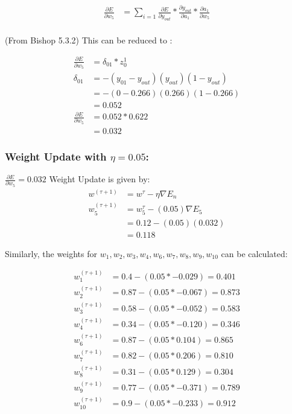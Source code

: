 \documentclass[a4paper]{article}
\begin{document}
\begin{align*}
    \frac{\partial E}{\partial w_{5}} &= \sum_{i=1} \frac{\partial E}{\partial y_{out}}* 
                                                \frac{\partial y_{out}}{\partial a_{1}}*
                                                \frac{\partial a_{1}}{\partial w_{5}}\\
\end{align*}{}

(From Bishop 5.3.2) This can be reduced to :

\begin{align*}
    \frac{\partial E}{\partial w_{5}} &= \delta_{01}*z_{0}^{1} \\
    \delta_{01} &= - (y_{01} - y_{out})(y_{out})(1 - y_{out})\\
                &= - (0 - 0.266)(0.266)(1-0.266) \\
                &= 0.052 \\
    \frac{\partial E}{\partial w_{5}} &= 0.052 * 0.622 \\
    &= 0.032
\end{align*}{}

\subsubsection*{Weight Update with $\eta = 0.05$:}

$\frac{\partial E}{\partial w_{5}} = 0.032$ 
Weight Update is given by:
\begin{align*}
    w^{(\tau + 1 )} &= w^{\tau} - \eta \nabla E_{n} \\
    w_{5}^{(\tau + 1 )} &= w_{5}^{\tau} - (0.05) \nabla E_{5} \\
    &= 0.12 - (0.05)(0.032) \\
    &= 0.118
\end{align*}{}

Similarly, the weights for $w_{1}, w_{2}, w_{3}, w_{4},w_{6}, w_{7}, w_{8}, w_{9}, w_{10}$ can be calculated:

\begin{align*}
    w_{1}^{(\tau + 1 )} &= 0.4 - (0.05 * -0.029) = 0.401 \\
    w_{2}^{(\tau + 1 )} &= 0.87 - (0.05 * -0.067) = 0.873 \\
    w_{3}^{(\tau + 1 )} &= 0.58 - (0.05 * -0.052) = 0.583\\
    w_{4}^{(\tau + 1 )} &= 0.34 - (0.05 * -0.120) = 0.346 \\
    w_{6}^{(\tau + 1 )} &= 0.87 - (0.05 * 0.104) = 0.865 \\
    w_{7}^{(\tau + 1 )} &= 0.82 - (0.05 * 0.206) = 0.810\\
    w_{8}^{(\tau + 1 )} &= 0.31 - (0.05 * 0.129) = 0.304\\
    w_{9}^{(\tau + 1 )} &= 0.77 - (0.05 * -0.371) = 0.789\\
    w_{10}^{(\tau + 1 )} &= 0.9 - (0.05 * -0.233) = 0.912\\
\end{align*}{}
\end{document}
